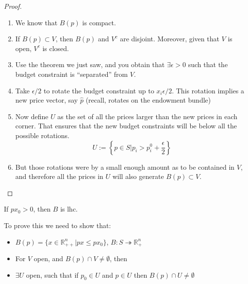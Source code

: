 \documentclass[aspectratio=169]{beamer}
\begin{document}
\begin{frame}
    \begin{proof}
        \begin{enumerate}
            \item We know that $B(p)$ is compact.
            \item If $B(p)\subset V$, then $B(p)$ and $V^c$ are disjoint. Moreover, given that $V$ is open, $V^c$ is closed.
            \item Use the theorem we just saw, and you obtain that $\exists \epsilon > 0$ such that the budget constraint is ``separated'' from $V$.
            \item Take $\epsilon/2$ to rotate the budget constraint up to $x_i\epsilon/2$. This rotation implies a new price vector, say $\hat{p}$ (recall, rotates on the endowment bundle)
            \item Now define $U$ as the set of all the prices larger than the new prices in each corner. That ensures that the new budget constraints will be below all the possible rotations.\[U:=\left\{p\in S| p_i>p_i^0+\frac{\epsilon}{2}\right\}\]
            \item But those rotations were by a small enough amount as to be contained in $V$, and therefore all the prices in $U$ will also generate $B(p)\subset V$.
        \end{enumerate}
    \end{proof}
\end{frame}

\begin{frame}
    \begin{figure}
    \end{figure}
\end{frame}

\begin{frame}
    \begin{theorem}
        If $p x_0>0$, then $B$ is lhc.
    \end{theorem}

    To prove this we need to show that:

    \begin{itemize}
        \item $B(p)=\{x\in\mathds{R}^n_{++} | px \leq px_0\}$, $B:S\twoheadrightarrow \mathds{R}^n_{+}$
        \item For $V$ open, and $B(p)\cap V\neq \emptyset$, then
        \item $\exists U$ open, such that if $p_0\in U$ and $p\in U$ then $B(p)\cap U\neq\emptyset$
    \end{itemize}

\end{frame}
\end{document}

